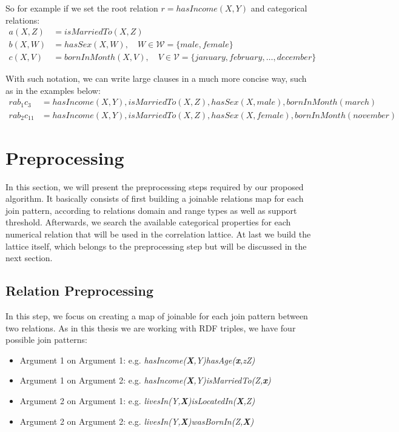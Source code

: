 So for example if we set the root relation $r=hasIncome(X,Y)$ and categorical relations:
\begin{align*}
a(X,Z)&=isMarriedTo(X,Z) \\
b(X,W)&=hasSex(X,W), \quad W \in \mathcal{W} =\{male,female\} \\
c(X,V)&=bornInMonth(X,V), \quad V \in \mathcal{V} =\{january,february,\ldots,december\}
\end{align*}

With such notation, we can write large clauses in a much more concise way, such as in the examples below:
\begin{align*}
rab_1c_3 &= hasIncome(X,Y),isMarriedTo(X,Z),hasSex(X,male),bornInMonth(march) \\
rab_2c_{11} &= hasIncome(X,Y),isMarriedTo(X,Z),hasSex(X,female),bornInMonth(november)
\end{align*}


\section{Preprocessing}

In this section, we will present the preprocessing steps required by our proposed algorithm. It basically consists of
first building a joinable relations map for each join pattern, according
to relations domain and range types as well as support threshold. Afterwards, we search the available categorical
properties for each numerical relation that will be used in the correlation lattice. At last we build the lattice
itself, which belongs to the preprocessing step but will be discussed in the next section.

\subsection{Relation Preprocessing}

In this step, we focus on creating a map of joinable for each join pattern between two relations. As in this thesis we
are working with RDF triples, we have four possible join patterns:

\begin{itemize}
 \item Argument 1 on Argument 1: e.g. \emph{hasIncome(\textbf{X},Y)hasAge(\textbf{x},zZ)}
 \item Argument 1 on Argument 2: e.g. \emph{hasIncome(\textbf{X},Y)isMarriedTo(Z,\textbf{x})}
 \item Argument 2 on Argument 1: e.g. \emph{livesIn(Y,\textbf{X})isLocatedIn(\textbf{X},Z)}
 \item Argument 2 on Argument 2: e.g. \emph{livesIn(Y,\textbf{X})wasBornIn(Z,\textbf{X})}
\end{itemize}

